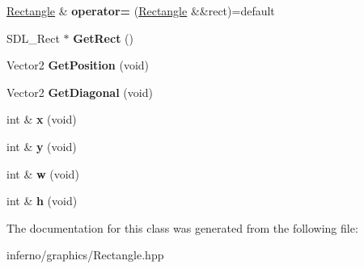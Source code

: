 \begin{DoxyCompactItemize}
\mbox{\label{classinferno_1_1graphics_1_1_rectangle_adb5ebed14b2f169e868c2b92a91c44fa}} 
\mbox{\hyperlink{classinferno_1_1graphics_1_1_rectangle}{Rectangle}} \& {\bfseries operator=} (\mbox{\hyperlink{classinferno_1_1graphics_1_1_rectangle}{Rectangle}} \&\&rect)=default
\item 
\mbox{\label{classinferno_1_1graphics_1_1_rectangle_a9e387b78a1e65f30f43c8c6fb7dc48fd}} 
S\+D\+L\+\_\+\+Rect $\ast$ {\bfseries Get\+Rect} ()
\item 
\mbox{\label{classinferno_1_1graphics_1_1_rectangle_a692a68e1d5d637deeebb3e720d5e7c4c}} 
Vector2 {\bfseries Get\+Position} (void)
\item 
\mbox{\label{classinferno_1_1graphics_1_1_rectangle_a7cdef92244adc6e3ed90eec613681c48}} 
Vector2 {\bfseries Get\+Diagonal} (void)
\item 
\mbox{\label{classinferno_1_1graphics_1_1_rectangle_a4ea617a6c8ad8e17016c33b403d88e17}} 
int \& {\bfseries x} (void)
\item 
\mbox{\label{classinferno_1_1graphics_1_1_rectangle_a91bd890f58f8ea1396d78e36850edab3}} 
int \& {\bfseries y} (void)
\item 
\mbox{\label{classinferno_1_1graphics_1_1_rectangle_ac69abd232d10ed0fa5c3b1a5374b973f}} 
int \& {\bfseries w} (void)
\item 
\mbox{\label{classinferno_1_1graphics_1_1_rectangle_afcd7bfb62d8ccfa612178ae2a11d3ce8}} 
int \& {\bfseries h} (void)
\end{DoxyCompactItemize}


The documentation for this class was generated from the following file\+:\begin{DoxyCompactItemize}
\item 
inferno/graphics/Rectangle.\+hpp\end{DoxyCompactItemize}
